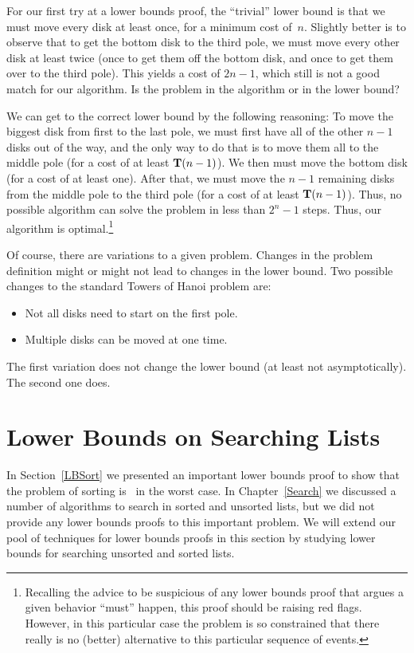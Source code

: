 For our first try at a lower bounds proof, the ``trivial'' lower bound
is that we must move every disk at least once, for a minimum cost
of~\(n\).
Slightly better is to observe that to get the bottom disk to the third
pole, we must move every other disk at least twice (once to get them
off the bottom disk, and once to get them over to the third pole).
This yields a cost of \(2n - 1\), which still is not a good match for
our algorithm.
Is the problem in the algorithm or in the lower bound?

We can get to the correct lower bound by the following reasoning:
To move the biggest disk from first to the last pole, we must first
have all of the other \(n-1\) disks out of the way, and the only way
to do that is to move them all to the middle pole (for a cost of at
least \({\bf T}(n-1)\)).
We then must move the bottom disk (for a cost of at least one).
After that, we must move the \(n-1\) remaining disks from the middle
pole to the third pole (for a cost of at least \({\bf T}(n-1)\)).
Thus, no possible algorithm can solve the problem in less than
\(2^n-1\) steps.
Thus, our algorithm is optimal.\footnote{Recalling the advice to be
suspicious of any lower bounds proof that argues a given behavior
``must'' happen, this proof should be raising red flags.
However, in this particular case the problem is so constrained that
there really is no (better) alternative to this particular sequence of
events.}

Of course, there are variations to a given problem.
Changes in the problem definition might or might not lead to changes
in the lower bound.
Two possible changes to the standard Towers of Hanoi problem are:
\begin{itemize}
\item
Not all disks need to start on the first pole.
\item Multiple disks can be moved at one time.
\end{itemize}

\noindent The first variation does not change the lower bound (at
least not asymptotically).
The second one does.

\section{Lower Bounds on Searching Lists}
\label{BoundsSearch}

In Section~\ref{LBSort} we presented an important lower bounds proof
to show that the problem of sorting is \Thetanlogn\ in the worst case.
In Chapter~\ref{Search} we discussed a number of algorithms to search
in sorted and unsorted lists, but we did not provide any lower bounds
proofs to this important problem.
We will extend our pool of techniques for lower bounds proofs in this
section by studying lower bounds for searching unsorted and sorted lists.


